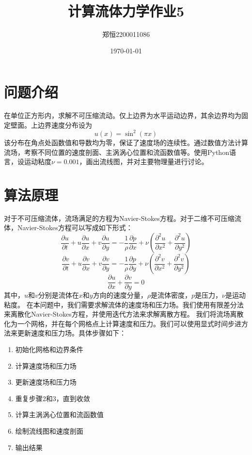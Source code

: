 \documentclass[12pt,a4paper]{article}
\title{计算流体力学作业5}
\author{郑恒2200011086}
\date{\today}
\begin{document}
\maketitle

\section{问题介绍}
在单位正方形内，求解不可压缩流动。仅上边界为水平运动边界，其余边界均为固定壁面。上边界速度分布设为
\[
u(x) = \sin^2(\pi x)
\]
该分布在角点处函数值和导数均为零，保证了速度场的连续性。通过数值方法计算流场，考察不同位置的速度剖面、主涡涡心位置和流函数值等。使用Python语言，设运动粘度$\nu=0.001$，画出流线图，并对主要物理量进行讨论。

\section{算法原理}
对于不可压缩流体，流场满足的方程为Navier-Stokes方程。对于二维不可压缩流体，Navier-Stokes方程可以写成如下形式：
\begin{equation}
    \frac{\partial u}{\partial t} + u \frac{\partial u}{\partial x} + v \frac{\partial u}{\partial y} = -\frac{1}{\rho} \frac{\partial p}{\partial x} + \nu \left( \frac{\partial^2 u}{\partial x^2} + \frac{\partial^2 u}{\partial y^2} \right)
\end{equation}
\begin{equation}
    \frac{\partial v}{\partial t} + u \frac{\partial v}{\partial x} + v \frac{\partial v}{\partial y} = -\frac{1}{\rho} \frac{\partial p}{\partial y} + \nu \left( \frac{\partial^2 v}{\partial x^2} + \frac{\partial^2 v}{\partial y^2} \right)
\end{equation}
\begin{equation}
    \frac{\partial u}{\partial x} + \frac{\partial v}{\partial y} = 0
\end{equation}
其中，$u$和$v$分别是流体在$x$和$y$方向的速度分量，$\rho$是流体密度，$p$是压力，$\nu$是运动粘度。
在本问题中，我们需要求解流体的速度场和压力场。我们使用有限差分法来离散化Navier-Stokes方程，并使用迭代方法来求解离散方程。
我们将流场离散化为一个网格，并在每个网格点上计算速度和压力。我们可以使用显式时间步进方法来更新速度和压力场。具体步骤如下：
\begin{enumerate}
    \item 初始化网格和边界条件
    \item 计算速度场和压力场
    \item 更新速度场和压力场
    \item 重复步骤2和3，直到收敛
    \item 计算主涡涡心位置和流函数值
    \item 绘制流线图和速度剖面
    \item 输出结果
\end{enumerate}
\end{document}
